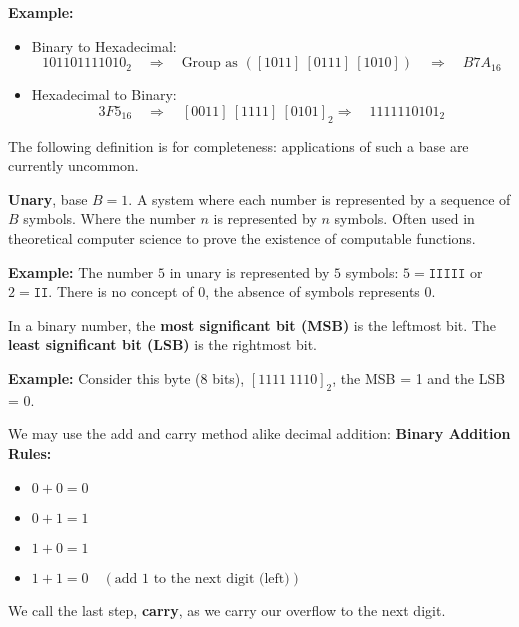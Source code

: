 \noindent
\textbf{Example:}
    \begin{itemize}
        \item Binary to Hexadecimal:
        \[
        101101111010_2 \quad \Rightarrow \quad \text{Group as } ([1011] \ [0111] \ [1010]) \quad \Rightarrow \quad B7A_{16}
        \]
        \item Hexadecimal to Binary:
        \[
        3F5_{16} \quad \Rightarrow \quad [0011]\ [1111]\ [0101]_2 \Rightarrow \quad 1111110101_2
        \]
        \noindent
    \end{itemize}
    \noindent

\newpage 

\noindent
The following definition is for completeness: applications of such a base are currently uncommon.
\begin{Def}[Unary]
    
    \textbf{Unary}, base $B=1$. A system where each number is represented by a sequence of $B$ symbols. Where the number $n$ is represented by $n$ symbols. Often used in theoretical computer science to prove the existence of computable functions.
\end{Def}
\noindent
\textbf{Example:} The number $5$ in unary is represented by $5$ symbols: $5 = \texttt{IIIII}$ or $2= \texttt{II}$. There is no concept of 0, the absence of symbols represents 0.\\
\begin{Def}
    
    In a binary number, the \textbf{most significant bit (MSB)} is the leftmost bit. The \textbf{least significant bit (LSB)} is the rightmost bit.
\end{Def}
\textbf{Example:} Consider this byte (8 bits), $[1111 \ 1110]_2$, the MSB = 1 and the LSB = 0.  

\begin{theo}

    We may use the add and carry method alike decimal addition:
    \textbf{Binary Addition Rules:}
    \begin{itemize}
        \item $0 + 0 = 0$
        \item $0 + 1 = 1$
        \item $1 + 0 = 1$
        \item $1 + 1 = 0 \quad (\text{add 1 to the next digit (left)})$
    \end{itemize}
    \noindent
    We call the last step, \textbf{carry}, as we carry our overflow to the next digit.
\end{theo}

